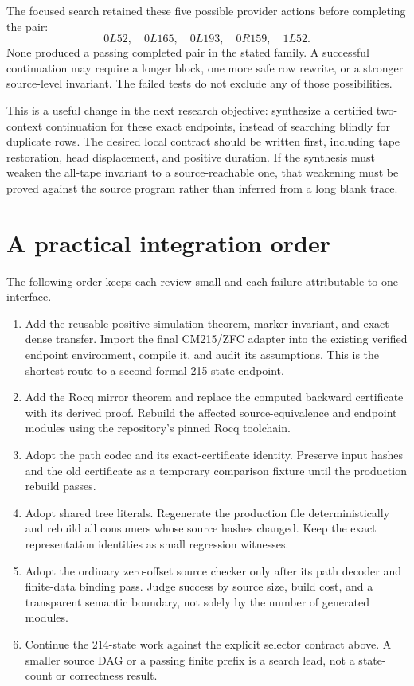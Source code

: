 \documentclass[11pt]{article}
\begin{document}
The focused search retained these five possible provider actions before completing the pair:
\[
 0L52,\quad0L165,\quad0L193,\quad0R159,\quad1L52.
\]
None produced a passing completed pair in the stated family. A successful continuation may require a longer block, one more safe row rewrite, or a stronger source-level invariant. The failed tests do not exclude any of those possibilities.

This is a useful change in the next research objective: synthesize a certified two-context continuation for these exact endpoints, instead of searching blindly for duplicate rows. The desired local contract should be written first, including tape restoration, head displacement, and positive duration. If the synthesis must weaken the all-tape invariant to a source-reachable one, that weakening must be proved against the source program rather than inferred from a long blank trace.

\section{A practical integration order}

The following order keeps each review small and each failure attributable to one interface.
\begin{enumerate}
\item Add the reusable positive-simulation theorem, marker invariant, and exact dense transfer. Import the final CM215/ZFC adapter into the existing verified endpoint environment, compile it, and audit its assumptions. This is the shortest route to a second formal 215-state endpoint.
\item Add the Rocq mirror theorem and replace the computed backward certificate with its derived proof. Rebuild the affected source-equivalence and endpoint modules using the repository's pinned Rocq toolchain.
\item Adopt the path codec and its exact-certificate identity. Preserve input hashes and the old certificate as a temporary comparison fixture until the production rebuild passes.
\item Adopt shared tree literals. Regenerate the production file deterministically and rebuild all consumers whose source hashes changed. Keep the exact representation identities as small regression witnesses.
\item Adopt the ordinary zero-offset source checker only after its path decoder and finite-data binding pass. Judge success by source size, build cost, and a transparent semantic boundary, not solely by the number of generated modules.
\item Continue the 214-state work against the explicit selector contract above. A smaller source DAG or a passing finite prefix is a search lead, not a state-count or correctness result.
\end{enumerate}
\end{document}

